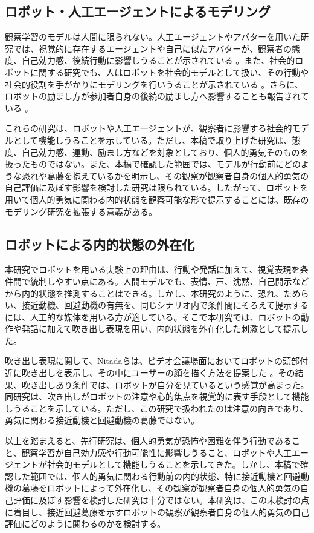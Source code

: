 \documentclass[utf8]{FrontiersinHarvard}
\begin{document}
\subsection{ロボット・人工エージェントによるモデリング}

観察学習のモデルは人間に限られない。人工エージェントやアバターを用いた研究では、視覚的に存在するエージェントや自己に似たアバターが、観察者の態度、自己効力感、後続行動に影響しうることが示されている \citep{rosenberg2008,fox2009}。また、社会的ロボットに関する研究でも、人はロボットを社会的モデルとして扱い、その行動や社会的役割を手がかりにモデリングを行いうることが示されている \citep{xu2023}。さらに、ロボットの励まし方が参加者自身の後続の励まし方へ影響することも報告されている \citep{higashino2023}。

これらの研究は、ロボットや人工エージェントが、観察者に影響する社会的モデルとして機能しうることを示している。ただし、本稿で取り上げた研究は、態度、自己効力感、運動、励まし方などを対象としており、個人的勇気そのものを扱ったものではない。また、本稿で確認した範囲では、モデルが行動前にどのような恐れや葛藤を抱えているかを明示し、その観察が観察者自身の個人的勇気の自己評価に及ぼす影響を検討した研究は限られている。したがって、ロボットを用いて個人的勇気に関わる内的状態を観察可能な形で提示することには、既存のモデリング研究を拡張する意義がある。

\subsection{ロボットによる内的状態の外在化}

本研究でロボットを用いる実験上の理由は、行動や発話に加えて、視覚表現を条件間で統制しやすい点にある。人間モデルでも、表情、声、沈黙、自己開示などから内的状態を推測することはできる。しかし、本研究のように、恐れ、ためらい、接近動機、回避動機の有無を、同じシナリオ内で条件間にそろえて提示するには、人工的な媒体を用いる方が適している。そこで本研究では、ロボットの動作や発話に加えて吹き出し表現を用い、内的状態を外在化した刺激として提示した。

吹き出し表現に関して、Nitadaらは、ビデオ会議場面においてロボットの頭部付近に吹き出しを表示し、その中にユーザーの顔を描く方法を提案した \citep{nitada2021}。その結果、吹き出しあり条件では、ロボットが自分を見ているという感覚が高まった。同研究は、吹き出しがロボットの注意や心的焦点を視覚的に表す手段として機能しうることを示している。ただし、この研究で扱われたのは注意の向きであり、勇気に関わる接近動機と回避動機の葛藤ではない。

以上を踏まえると、先行研究は、個人的勇気が恐怖や困難を伴う行動であること、観察学習が自己効力感や行動可能性に影響しうること、ロボットや人工エージェントが社会的モデルとして機能しうることを示してきた。しかし、本稿で確認した範囲では、個人的勇気に関わる行動前の内的状態、特に接近動機と回避動機の葛藤をロボットによって外在化し、その観察が観察者自身の個人的勇気の自己評価に及ぼす影響を検討した研究は十分ではない。本研究は、この未検討の点に着目し、接近回避葛藤を示すロボットの観察が観察者自身の個人的勇気の自己評価にどのように関わるのかを検討する。
\end{document}
